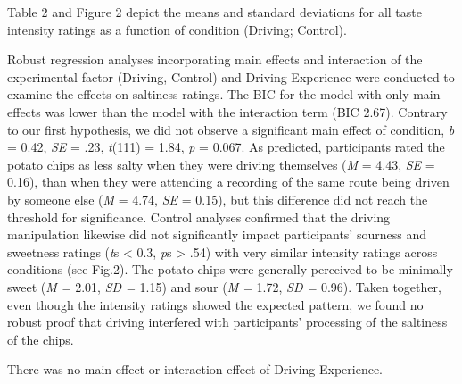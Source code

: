 \documentclass[authordate, empirical]{jote-new-article}
\begin{document}
Table 2 and Figure 2 depict the means and standard deviations for all taste intensity ratings as a function of condition (Driving; Control).








Robust regression analyses incorporating main effects and interaction of the experimental factor (Driving, Control) and Driving Experience were conducted to examine the effects on saltiness ratings. The BIC for the model with only main effects was lower than the model with the interaction term (BIC 2.67). Contrary to our first hypothesis, we did not observe a significant main effect of condition, \emph{b }= 0.42, \emph{SE }= .23, \emph{t}(111) = 1.84, \emph{p }= 0.067. As predicted, participants rated the potato chips as less salty when they were driving themselves (\emph{M }= 4.43, \emph{SE }= 0.16), than when they were attending a recording of the same route being driven by someone else (\emph{M }= 4.74, \emph{SE }= 0.15), but this difference did not reach the threshold for significance. Control analyses confirmed that the driving manipulation likewise did not significantly impact participants’ sourness and sweetness ratings (\emph{t}s < 0.3, \emph{p}s > .54) with very similar intensity ratings across conditions (see Fig.2). The potato chips were generally perceived to be minimally sweet (\emph{M = }2.01, \emph{SD = }1.15) and sour (\emph{M = }1.72, \emph{SD = }0.96). Taken together, even though the intensity ratings showed the expected pattern, we found no robust proof that driving interfered with participants’ processing of the saltiness of the chips.



There was no main effect or interaction effect of Driving Experience.
\end{document}
